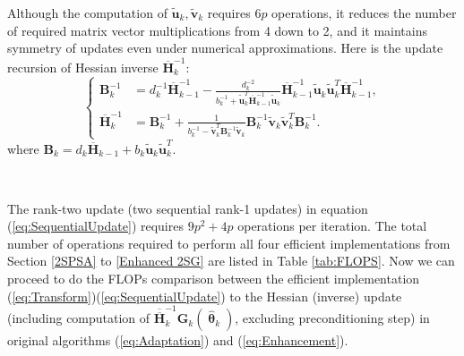 \documentclass[conference,10.3cpt]{IEEEtran}
\newcommand{\bG}{\bm{G}}
\newcommand{\oH}{\bm{\overline{H}}}
\newcommand{\ooH}{\bm{\overline{\overline{H}}}}
\newcommand{\htheta}{\bm{\hat{\uptheta}}}
\begin{document}
Although the computation of $\bm{\tilde{u}}_k,
\bm{\tilde{v}}_k$ requires $6p$ operations, it reduces the number of
 required matrix vector multiplications from 4 down to 2, and it
maintains symmetry of updates even under numerical approximations. Here is the update recursion of Hessian inverse $\oH_k^{-1}$:
\begin{equation} \label{eq:SequentialUpdate}
  \begin{cases} \bm{B}_k^{-1} &= d_k^{-1}\oH_{k-1}^{-1}
    -
    \frac{d_k^{-2}}{b_k^{-1}+\bm{\tilde{u}}_k^{T}\oH_{k-1}^{-1}\bm{\tilde{u}}_k}
    \oH_{k-1}^{-1}\bm{\tilde{u}}_k \bm{\tilde{u}}_k^{T}\oH_{k-1}^{-1},\\
    \oH_k^{-1} &=\bm{B}_k^{-1} +
    \frac{1}{b_k^{-1}-\bm{\tilde{v}}_k^{T}\bm{B}_k^{-1}\bm{\tilde{v}}_k}
    \bm{B}_k^{-1}\bm{\tilde{v}}_k \bm{\tilde{v}}_k^{T}\bm{B}_{k}^{-1}.
  \end{cases}
\end{equation}
where $\bm{B}_k=d_k\oH_{k-1}+b_k\bm{\tilde{u}}_k  \bm{\tilde{u}}_k^{T}$.

\begin{table} [!hbp] \centering 
	\\[2pt]
		\caption{FLOPS required in eq. (\ref{eq:Transform})\text{--}(\ref{eq:SequentialUpdate})  }
		\label{tab:FLOPS}
	\end{table}

The rank-two update (two sequential rank-1 updates) in
equation (\ref{eq:SequentialUpdate}) requires $9p^2 + 4p$ operations
per iteration. The total number of operations required to perform all four
efficient implementations from Section \ref{2SPSA} to \ref{Enhanced
  2SG} are listed in Table \ref{tab:FLOPS}. Now we can proceed to do the FLOPs comparison between the efficient implementation (\ref{eq:Transform})\text{--}(\ref{eq:SequentialUpdate}) to the Hessian (inverse) update (including computation of $\ooH_k^{-1} \bG_k(\htheta_k)$, excluding preconditioning step) in original algorithms (\ref{eq:Adaptation}) and (\ref{eq:Enhancement}).
\end{document}
